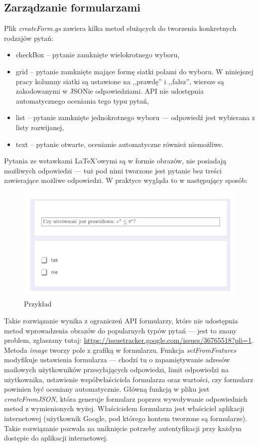 \subsection{Zarządzanie formularzami}
Plik \textit{createForm.gs} zawiera kilka metod służących do tworzenia konkretnych rodzajów pytań:
\begin{itemize}
\item checkBox -- pytanie zamknięte wielokrotnego wyboru,
\item grid -- pytanie zamknięte mające formę siatki polami do wyboru. W niniejszej pracy kolumny siatki są ustawione na ,,prawdę'' i ,,fałsz'', wiersze są zakodowanymi w JSONie odpowiedziami. API nie udostępnia automatycznego oceniania tego typu pytań,
\item list -- pytanie zamknięte jednokrotnego wyboru --- odpowiedź jest wybierana z listy rozwijanej,
\item text -- pytanie otwarte, ocenianie automatyczne również niemożliwe.

\end{itemize}
Pytania ze wstawkami \LaTeX{}'owymi są w formie obrazów, nie posiadają możliwych odpowiedzi --- tuż pod nimi tworzone jest pytanie bez treści zawierające możliwe odpowiedzi. W praktyce wygląda to w następujący sposób:
\begin{figure}[H]
  
  \centering
  \includegraphics[scale=0.75]{przyklad.png}
  \caption{Przykład}
  \label{fig:1}
\end{figure}
Takie rozwiązanie wynika z ograniczeń  API formularzy, które nie udostępnia metod wprowadzenia obrazów do popularnych typów pytań --- jest to znany problem, zgłaszany tutaj: \href{https://issuetracker.google.com/issues/36765518?pli=1}{https://issuetracker.google.com/issues/36765518?pli=1}. Metoda \textit{image} tworzy pole z grafiką w formularzu. 
Funkcja \textit{setFromFeatures} modyfikuje ustawienia formularza --- chodzi tu o zapamiętywanie adresów mailowych użytkowników przesyłających odpowiedzi, limit odpowiedzi na użytkownika, ustawienie współwłaściciela formularza oraz wartości, czy formularz powinien być oceniany automatycznie.
\ind Główną funkcją w pliku jest \textit{createFromJSON}, która generuje formularz poprzez wywoływanie odpowiednich metod z wymienionych wyżej. Właścicielem formularza jest właściciel aplikacji internetowej (użytkownik Google, pod którego  kontem tworzone są formularze). Takie rozwiązanie pozwala na uniknięcie potrzeby autentyfikacji przy każdym dostępie do aplikacji internetowej.

